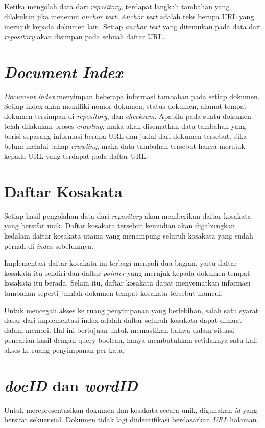 Ketika mengolah data dari \emph{repository}, terdapat langkah tambahan yang
dilakukan jika menemui \emph{anchor text}. \emph{Anchor text} adalah teks berupa
URL yang merujuk kepada dokumen lain. Setiap \emph{anchor text} yang ditemukan
pada data dari \emph{repository} akan disimpan pada sebuah daftar URL\@.

\section{\emph{Document Index}}
\emph{Document index} menyimpan beberapa informasi tambahan pada setiap dokumen.
Setiap index akan memiliki nomor dokumen, status dokumen, alamat tempat dokumen
tersimpan di \emph{repository}, dan \emph{checksum}. Apabila pada suatu dokumen
telah dilakukan proses \emph{crawling}, maka akan disematkan data tambahan yang
berisi sepasang informasi berupa URL dan judul dari dokumen tersebut. Jika
belum melalui tahap \emph{crawling}, maka data tambahan tersebut hanya merujuk
kepada URL yang terdapat pada daftar URL\@.

\section{Daftar Kosakata}

Setiap hasil pengolahan data dari \emph{repository} akan memberikan daftar
kosakata yang bersifat unik. Daftar kosakata tersebut kemudian akan digabungkan
kedalam daftar kosakata utama yang menampung seluruh kosakata yang sudah pernah
di-\textit{index} sebelumnya.

Implementasi daftar kosakata ini terbagi menjadi dua bagian, yaitu daftar
kosakata itu sendiri dan daftar \emph{pointer} yang merujuk kepada dokumen
tempat kosakata itu berada. Selain itu, daftar kosakata dapat menyematkan
informasi tambahan seperti jumlah dokumen tempat kosakata tersebut muncul.

Untuk mencegah akses ke ruang penyimpanan yang berlebihan, salah satu syarat
dasar dari implementasi index adalah daftar seluruh kosakata dapat dimuat dalam
memori. Hal ini bertujuan untuk memastikan bahwa dalam situasi pencarian hasil
dengan query boolean, hanya membutuhkan setidaknya satu kali akses ke ruang
penyimpanan per kata.

\section{\textit{docID} dan \textit{wordID}}

Untuk merepresentasikan dokumen dan kosakata secara unik, digunakan \textit{id} 
yang bersifat sekuensial. Dokumen tidak lagi diidentifikasi berdasarkan
\textit{URL} halaman.

